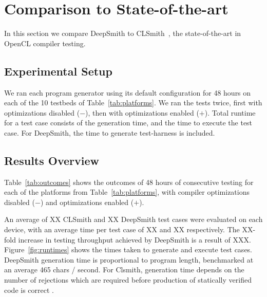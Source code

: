 \section{Comparison to State-of-the-art}\label{sec:vs_clsmith}

In this section we compare DeepSmith to CLSmith~\cite{Lidbury2015a}, the state-of-the-art in OpenCL compiler testing.

\subsection{Experimental Setup}

We ran each program generator using its default configuration for 48 hours on each of the 10 testbeds of Table~\ref{tab:platforms}. We ran the tests twice, first with optimizations disabled ($-$), then with optimizations enabled ($+$). Total runtime for a test case consists of the generation time, and the time to execute the test case. For DeepSmith, the time to generate test-harness is included.


\subsection{Results Overview}

\begin{table}
  \scriptsize %
  \centering %
  
  \caption{%
    Results from 48 hours of testing using CLSmith and DeepSmith. Testbed \#. as per Table~\ref{tab:platforms}. $\pm$ denotes optimizations off ($-$) vs on ($+$). The remaining columns denote build failure (\textbf{bf}), build crash (\textbf{bc}), build timeout (\textbf{bto}), runtime crash (\textbf{c}), timeout (\textbf{to}), and passed (\textbf{\cmark}) outcomes for CLSmith and DeepSmith, respectively.%
  }
  \label{tab:outcomes}
\end{table}

Table~\ref{tab:outcomes} shows the outcomes of 48 hours of consecutive testing for each of the platforms from Table~\ref{tab:platforms}, with compiler optimizations disabled ($-$) and optimizations enabled ($+$).

An average of XX CLSmith and XX DeepSmith test cases were evaluated on each device, with an average time per test case of XX and XX respectively. The XX-fold increase in testing throughput achieved by DeepSmith is a result of XXX. Figure~\ref{fig:runtimes} shows the times taken to generate and execute test cases. DeepSmith generation time is proportional to program length, benchmarked at an average 465 chars / second. For Clsmith, generation time depends on the number of rejections which are required before production of statically verified code is correct .

